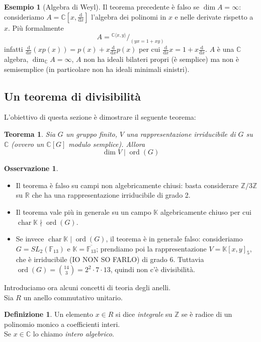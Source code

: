 \documentclass[11pt]{article}
\theoremstyle{plain}
\newtheorem{thm}{Teorema}[section]
\theoremstyle{definition}
\newtheorem{defn}{Definizione}[section]
\newtheorem{exmp}{Esempio}[section]
\newtheorem*{rem}{Osservazione}
\theoremstyle{remark}
\newcommand{\C}{\mathbb{C}}
\newcommand{\R}{\mathbb{R}}
\newcommand{\K}{\mathbb{K}}
\newcommand{\Z}{\mathbb{Z}}
\newcommand*\quot[2]{{^{\textstyle #1}\big/_{\textstyle #2}}}
\newcommand{\dx}{\text{d}x}
\newcommand{\diff}{\text{d}}
\DeclareMathOperator{\Char}{char}
\DeclareMathOperator{\ord}{ord}
\begin{document}
\begin{exmp}[Algebra di Weyl]
	Il teorema precedente è falso se $\dim A = \infty$: consideriamo $A=\C\left[ x,\frac{\diff}{\dx} \right]$ l'algebra dei polinomi in $x$ e nelle derivate rispetto a $x$. Più formalmente
	\[
		A=\quot{\C\langle x,y\rangle}{(yx=1+xy)}
	\]
	infatti $\frac{\diff}{\dx}(xp(x)) = p(x)+x\frac{\diff}{\dx}p(x)$ per cui $\frac{\diff}{\dx}x=1+x\frac{\diff}{\dx}$. $A$ è una $\C$ algebra, $\dim_{\C} A = \infty$, $A$ non ha ideali bilateri propri (è semplice) ma non è semisemplice (in particolare non ha ideali minimali sinistri).
\end{exmp}






\subsection{Un teorema di divisibilità}
  L'obiettivo di questa sezione è dimostrare il seguente teorema:
  \begin{thm}\label{dim_mid_ordine}
    Sia $G$ un gruppo finito, $V$ una rappresentazione irriducibile di $G$ su $\C$ (ovvero un $\C[G]$ modulo semplice). Allora $$\dim V\mid  \ord(G)$$
  \end{thm}
  \begin{rem}$ $
   \begin{itemize}
    \item Il teorema è falso su campi non algebricamente chiusi: basta considerare $\Z/3\Z$ su $\R$ che ha una rappresentazione irriducibile di grado 2.
    \item Il teorema vale più in generale su un campo $\K$ algebricamente chiuso per cui $\Char \K \nmid \ord(G)$.
    \item Se invece $\Char \K\mid \ord(G)$, il teorema è in generale falso: consideriamo $G=SL_2(\mathbb F_{13})$ e $\K=\overline{\mathbb F_{13}}$; prendiamo poi la rappresentazione $V=\K[x,y]_5$, che è irriducibile (IO NON SO FARLO) di grado $6$. Tuttavia $\ord(G)=\binom{14}{3}=2^2\cdot7\cdot13$, quindi non c'è divisibilità.
   \end{itemize}
  \end{rem}
  Introduciamo ora alcuni concetti di teoria degli anelli.\\
  Sia $R$ un anello commutativo unitario.\\
  \begin{defn}
    Un elemento $x\in R$ si dice \textit{integrale} su $\Z$ se è radice di un polinomio monico a coefficienti interi.\\
    Se $x\in\C$ lo chiamo \textit{intero algebrico}.
  \end{defn}
\end{document}
